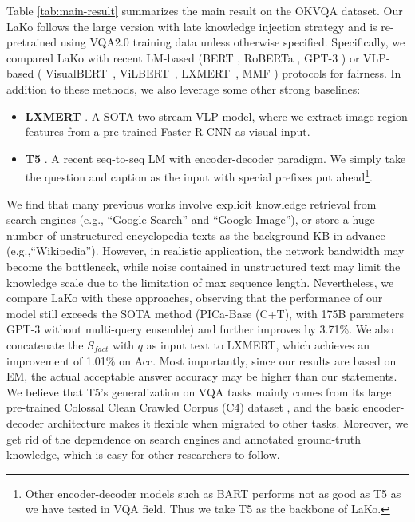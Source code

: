 \documentclass[sigconf]{acmart}
\newcommand{\cjy}[1]{{\color{black}#1}}
\begin{document}
Table \ref{tab:main-result} summarizes the main result on the OKVQA dataset. 
Our LaKo follows the large version with late knowledge injection strategy and is re-pretrained using VQA2.0 training data unless otherwise specified.
Specifically, we compared \cjy{LaKo} with recent LM-based (BERT \cite{DBLP:conf/naacl/DevlinCLT19}, RoBERTa \cite{DBLP:journals/corr/abs-1907-11692}, GPT-3 \cite{DBLP:conf/nips/BrownMRSKDNSSAA20}) or VLP-based ( VisualBERT~\cite{DBLP:journals/corr/abs-1908-03557},  ViLBERT~\cite{DBLP:conf/nips/LuBPL19}, LXMERT~\cite{DBLP:conf/emnlp/TanB19}, MMF \cite{singh2020mmf}) protocols for fair\cjy{ness}.
In addition to these methods, we also \cjy{leverage some} other strong baselines: 
\begin{itemize}
	\item \textbf{LXMERT} \citep{DBLP:conf/emnlp/TanB19}. A SOTA two stream VLP model, where we extract image region features from \cjy{a} pre-trained Faster R-CNN \citep{DBLP:journals/pami/RenHG017} as visual input.
	\item \textbf{T5} \citep{DBLP:conf/emnlp/TanB19}. A recent seq-to-seq LM with encoder-decoder paradigm. We simpl\cjy{y} take the question and caption as the input with special prefixes put ahead\footnote{Other encoder-decoder models such as BART \cite{DBLP:conf/acl/LewisLGGMLSZ20} performs not as good as T5 as we have tested in VQA field. Thus we take T5 as the backbone of LaKo.}.
\end{itemize}



We find that many previous works involve explicit knowledge retrieval from search engine\cjy{s} (e.g., ``Google Search'' and ``Google Image''), or store \cjy{a} huge number of unstructured encyclopedia texts as the background KB in advance (e.g.,``Wikipedia'').
However, in realistic application, the network bandwidth may become the bottleneck, while noise contained in unstructured text may limit the knowledge scale due to the limitation of max sequence length.
Nevertheless, we compare 
LaKo with these approaches, observing that the performance of our model still exceeds the SOTA method (PICa-Base (C+T), with 175B parameters GPT-3 without multi-query ensemble) and further improves by 3.71\%. 
We also concatenate the $S_{fact}$ with $q$ as input text to LXMERT, which achieves an improvement of 1.01\% on Acc.
Most importantly, since our results are based on EM, the actual acceptable answer accuracy may be higher than our statements. 
We believe that T5's generalization on VQA tasks mainly comes from its large pre-trained  Colossal Clean Crawled Corpus (C4) \citep{DBLP:conf/emnlp/TanB19} dataset , and the basic encoder-decoder architecture makes it flexible when migrated to other tasks. 
Moreover, we get rid of the dependence on search engines and annotated ground-truth knowledge, which is easy for other researchers to follow.
\end{document}
